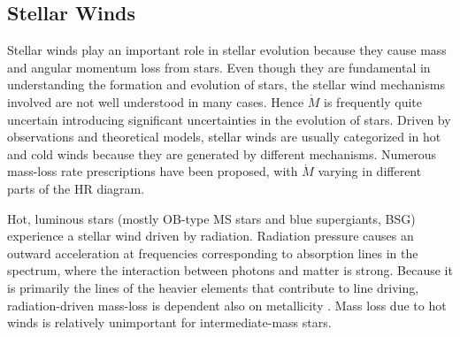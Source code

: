 \subsection{Stellar Winds}\label{sub:winds}

Stellar winds play an important role in stellar evolution because they cause mass and angular momentum loss from stars. Even though they are fundamental in understanding the formation and evolution of stars, the stellar wind mechanisms involved are not well understood in many cases. Hence $\dot{M}$ is frequently quite uncertain introducing significant uncertainties in the evolution of stars. Driven by observations and theoretical models, stellar winds are usually categorized in hot and cold winds because they are generated by different mechanisms. Numerous mass-loss rate prescriptions have been proposed, with $\dot{M}$ varying in different parts of the HR diagram.

Hot, luminous stars (mostly OB-type MS stars and blue supergiants, BSG) experience a stellar wind driven by radiation. Radiation pressure causes an outward acceleration at frequencies corresponding to absorption lines in the spectrum, where the interaction between photons and matter is strong. Because it is primarily the lines of the heavier elements that contribute to line driving, radiation-driven mass-loss is dependent also on metallicity \citep{vink2001mass}. Mass loss due to hot winds is relatively unimportant for intermediate-mass stars.

